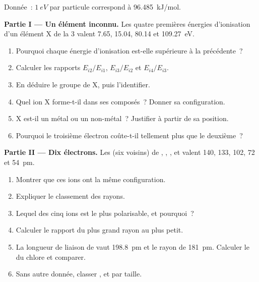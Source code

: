 \begin{problem}
\label{pb:b1:periodicity:1}
Donnée~: $\qty{1}{eV}$ par particule correspond à \qty{96.485}{kJ/mol}.

\medskip
\noindent\textbf{Partie I --- Un élément inconnu.}
Les quatre premières énergies d'ionisation d'un élément X de la
 3 valent 7.65, 15.04, 80.14 et \qty{109.27}{eV}.
\begin{enumerate}
  \item Pourquoi chaque énergie d'ionisation est-elle supérieure à la
        précédente~?
  \item Calculer les rapports $E_{i2}/E_{i1}$, $E_{i3}/E_{i2}$ et
        $E_{i4}/E_{i3}$.
  \item En déduire le groupe de X, puis l'identifier.
  \item Quel ion X forme-t-il dans ses composés~? Donner sa configuration.
  \item X est-il un métal ou un non-métal~? Justifier à partir de sa position.
  \item Pourquoi le troisième électron coûte-t-il tellement plus que le
        deuxième~?
\end{enumerate}

\medskip
\noindent\textbf{Partie II --- Dix électrons.}
Les  (six voisins) de , , ,
 et  valent 140, 133, 102, 72 et \qty{54}{pm}.
\begin{enumerate}[resume]
  \item Montrer que ces ions ont la même configuration.
  \item Expliquer le classement des rayons.
  \item Lequel des cinq ions est le plus polarisable, et pourquoi~?
  \item Calculer le rapport du plus grand rayon au plus petit.
  \item La longueur de liaison de  vaut \qty{198.8}{pm} et le
        rayon de  \qty{181}{pm}. Calculer le  du
        chlore et comparer.
  \item Sans autre donnée, classer ,  et 
        par taille.
\end{enumerate}


\end{problem}
